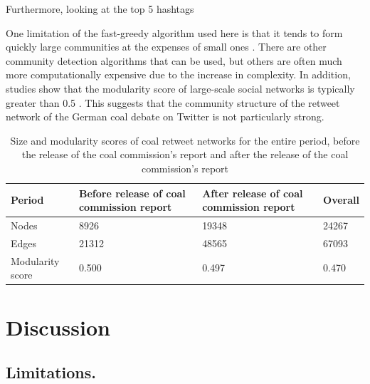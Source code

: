 \documentclass[12pt,onecolumn,twoside]{layout}
\begin{document}
Furthermore, looking at the top 5 hashtags 

One limitation of the fast-greedy algorithm used here is that it tends to form quickly large communities at the expenses of small ones \citep{Fortunato2010}. There are other community detection algorithms that can be used, but others are often much more computationally expensive due to the increase in complexity. In addition, studies show that the modularity score of large-scale social networks is typically greater than 0.5 \citep{Blondel2008}. This suggests that the community structure of the retweet network of the German coal debate on Twitter is not particularly strong.

\begin{table}[htbp]
\begin{center}
	\caption{Size and modularity scores of coal retweet networks for the entire period, before the release of the coal commission's report and after the release of the coal commission's report}
	\label{table:rt_network_mod}
	\begin{tabular}{| l | p{2.5cm} | p{2.5cm} | l |}
		\hline
		Period & Before release of coal commission report & After release of coal commission report & Overall \\ \hline
		Nodes & 8926 & 19348 & 24267 \\ \hline
		Edges & 21312 & 48565 & 67093 \\ \hline
		Modularity score & 0.500 & 0.497 & 0.470 \\ \hline
	\end{tabular}
\end{center}
\end{table}


\section{Discussion} \label{sec:discussion}
\subsection*{Limitations.}
\end{document}
